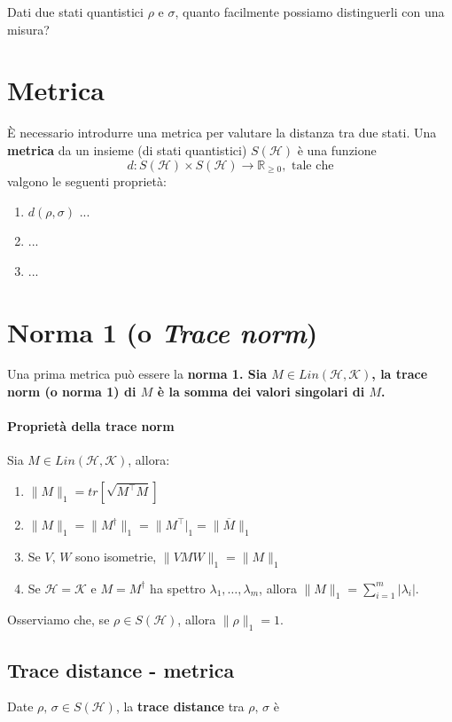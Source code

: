 \documentclass{report}
\begin{document}
Dati due stati quantistici $\rho$ e $\sigma$, quanto facilmente possiamo distinguerli con una misura?

\section{Metrica}
È necessario introdurre una metrica per valutare la distanza tra due stati.
Una \textbf{metrica} da un insieme (di stati quantistici) $S(\mathcal H)$ è una funzione 
\begin{equation}
d: S(\mathcal H) \times S(\mathcal H) \to \mathbb{R}_{\geq 0}, \text{ tale che}
\end{equation}
%
valgono le seguenti proprietà:
\begin{enumerate}
	\item $d(\rho, \sigma)$ ...
	\item ...
	\item ...
\end{enumerate}

\section{Norma 1 (o \textit{Trace norm})}
Una prima metrica può essere la \bf norma 1\rm. Sia $M \in Lin(\mathcal{H}, \mathcal K)$, la trace norm (o norma 1) di $M$ è la somma dei valori singolari di $M$.

\paragraph{Proprietà della trace norm}
Sia $M \in Lin(\mathcal H, \mathcal K)$, allora:
\begin{enumerate}
	\item $\|M\|_1 = tr[\sqrt{M^\top M}]$
	\item $\|M\|_1 = \|M^\dagger\|_1 = \|M^\top|_1 =\|\overline M\|_1$
	\item Se $V, \,W$ sono isometrie, $\|VMW\|_1 = \|M\|_1$
	\item Se $\mathcal H = \mathcal K$ e $M = M^\dagger$ ha spettro $\lambda_1, \dots, \lambda_m$, allora $\|M\|_1 =\displaystyle\sum_{i=1}^m |\lambda_i|$.
\end{enumerate}
%
Osserviamo che, se $\rho \in S(\mathcal H)$, allora $\|\rho\|_1 = 1$.

\subsection{Trace distance - metrica}
Date $\rho, \,\sigma \in S(\mathcal H)$, la \textbf{trace distance} tra $\rho, \, \sigma$ è
\end{document}
